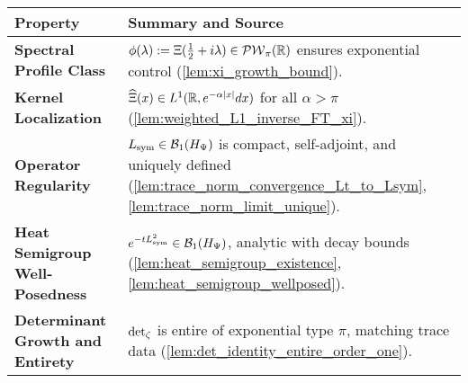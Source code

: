 \begin{center}
\renewcommand{\arraystretch}{1.4}
\begin{tabularx}{\textwidth}{|l|X|}
\hline
\textbf{Property} & \textbf{Summary and Source} \\
\hline
\textbf{Spectral Profile Class} & \( \phi(\lambda) := \Xi(\tfrac{1}{2} + i\lambda) \in \mathcal{PW}_{\pi}(\mathbb{R}) \) ensures exponential control (\cref{lem:xi_growth_bound}). \\
\textbf{Kernel Localization} & \( \widehat{\Xi}(x) \in L^1(\mathbb{R}, e^{-\alpha |x|} dx) \) for all \( \alpha > \pi \) (\cref{lem:weighted_L1_inverse_FT_xi}). \\
\textbf{Operator Regularity} & \( L_{\mathrm{sym}} \in \mathcal{B}_1(H_{\Psi}) \) is compact, self-adjoint, and uniquely defined (\cref{lem:trace_norm_convergence_Lt_to_Lsym}, \cref{lem:trace_norm_limit_unique}). \\
\textbf{Heat Semigroup Well-Posedness} & \( e^{-tL_{\mathrm{sym}}^2} \in \mathcal{B}_1(H_{\Psi}) \), analytic with decay bounds (\cref{lem:heat_semigroup_existence}, \cref{lem:heat_semigroup_wellposed}). \\
\textbf{Determinant Growth and Entirety} & \( \det\nolimits_{\zeta} \) is entire of exponential type \( \pi \), matching trace data (\cref{lem:det_identity_entire_order_one}). \\
\hline
\end{tabularx}
\end{center}

